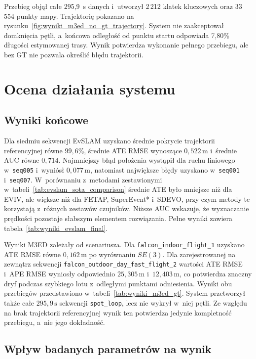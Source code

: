 Przebieg objął całe 295,9~s danych i~utworzył 2\,212 klatek kluczowych oraz 33\,554 punkty mapy. Trajektorię pokazano na rysunku~\ref{fig:wyniki_m3ed_no_gt_trajectory}. System nie zaakceptował domknięcia pętli, a~końcowa odległość od punktu startu odpowiada 7,80\% długości estymowanej trasy. Wynik potwierdza wykonanie pełnego przebiegu, ale bez GT nie pozwala określić błędu trajektorii.

\clearpage

\section{Ocena działania systemu}
\label{sec:wnioski}

\subsection{Wyniki końcowe}

Dla siedmiu sekwencji EvSLAM uzyskano średnie pokrycie trajektorii referencyjnej równe $99{,}6\%$, średnie ATE RMSE wynoszące $0{,}522\,\mathrm{m}$ i~średnie AUC równe $0{,}714$. Najmniejszy błąd położenia wystąpił dla ruchu liniowego w~\texttt{seq005} i~wyniósł $0{,}077\,\mathrm{m}$, natomiast największe błędy uzyskano w~\texttt{seq001} i~\texttt{seq007}. W~porównaniu z~metodami zestawionymi w~tabeli~\ref{tab:evslam_sota_comparison} średnie ATE było mniejsze niż dla EVIV, ale większe niż dla FETAP, SuperEvent* i~SDEVO, przy czym metody te korzystają z~różnych zestawów czujników. Niższe AUC wskazuje, że wyznaczanie prędkości pozostaje słabszym elementem rozwiązania. Pełne wyniki zawiera tabela~\ref{tab:wyniki_evslam_final}.

Wyniki M3ED zależały od scenariusza. Dla \texttt{falcon\_indoor\_flight\_1} uzyskano ATE RMSE równe $0{,}162\,\mathrm{m}$ po wyrównaniu $SE(3)$. Dla zarejestrowanej na zewnątrz sekwencji \texttt{falcon\_outdoor\_day\_fast\_flight\_2} wartości ATE RMSE i~APE RMSE wyniosły odpowiednio $25{,}305\,\mathrm{m}$ i~$12{,}403\,\mathrm{m}$, co potwierdza znaczny dryf podczas szybkiego lotu z~odległymi punktami odniesienia. Wyniki obu przebiegów przedstawiono w~tabeli~\ref{tab:wyniki_m3ed_gt}. System przetworzył także całe $295{,}9\,\mathrm{s}$ sekwencji \texttt{spot\_loop}, lecz nie wykrył w~niej pętli. Ze względu na brak trajektorii referencyjnej wynik ten potwierdza jedynie kompletność przebiegu, a~nie jego dokładność.

\subsection{Wpływ badanych parametrów na wynik}

